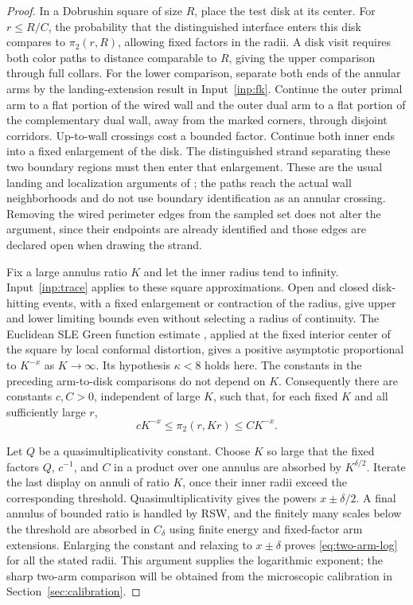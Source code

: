 \begin{proof}
In a Dobrushin square of size $R$, place the test disk at its center.
For $r\le R/C$, the probability that the distinguished interface enters
this disk compares to $\pi_2(r,R)$, allowing fixed factors in the
radii.  A disk visit requires both color paths to distance comparable
to $R$, giving the upper comparison through full collars.  For the
lower comparison, separate both ends of the annular arms by the
landing-extension result in Input~\ref{inp:fk}.  Continue the outer
primal arm to a flat portion of the wired wall and the outer dual arm
to a flat portion of the complementary dual wall, away from the marked
corners, through disjoint corridors.  Up-to-wall crossings cost a
bounded factor.  Continue both inner ends into a fixed enlargement of
the disk.  The distinguished strand separating these two boundary
regions must then enter that enlargement.  These are the usual
landing and localization arguments of \cite[Section~6]{DMT}; the
paths reach the actual wall neighborhoods and do not use boundary
identification as an annular crossing.  Removing the wired perimeter
edges from the sampled set does not alter the argument, since their
endpoints are already identified and those edges are declared open
when drawing the strand.

Fix a large annulus ratio $K$ and let the inner radius tend to infinity.
Input~\ref{inp:trace} applies to these square approximations.
Open and closed disk-hitting events, with a fixed enlargement or
contraction of the radius, give upper and lower limiting bounds even
without selecting a radius of continuity.  The Euclidean SLE Green
function estimate \cite[Theorem~2.3, Equation~(12)]{LawlerRezaeiBasic}, applied at
the fixed interior center of the square by local conformal distortion,
gives a positive asymptotic proportional to $K^{-x}$ as
$K\to\infty$.  Its hypothesis $\kappa<8$ holds here.  The constants
in the preceding arm-to-disk comparisons do not depend on $K$.
Consequently there are constants $c,C>0$, independent of large $K$,
such that, for each fixed $K$ and all sufficiently large $r$,
\[
 cK^{-x}\le\pi_2(r,Kr)\le CK^{-x}.
\]

Let $Q$ be a quasimultiplicativity constant.  Choose $K$ so large
that the fixed factors $Q$, $c^{-1}$, and $C$ in a product over one
annulus are absorbed by $K^{\delta/2}$.  Iterate the last display
on annuli of ratio $K$, once their inner radii exceed the corresponding
threshold.  Quasimultiplicativity gives the powers $x\pm\delta/2$.
A final annulus of bounded ratio is handled by RSW, and the finitely
many scales below the threshold are absorbed in $C_\delta$ using
finite energy and fixed-factor arm extensions.  Enlarging the constant
and relaxing to $x\pm\delta$ proves \eqref{eq:two-arm-log} for all
the stated radii.  This argument supplies the logarithmic exponent;
the sharp two-arm comparison will be obtained from the microscopic
calibration in Section~\ref{sec:calibration}.
\end{proof}
